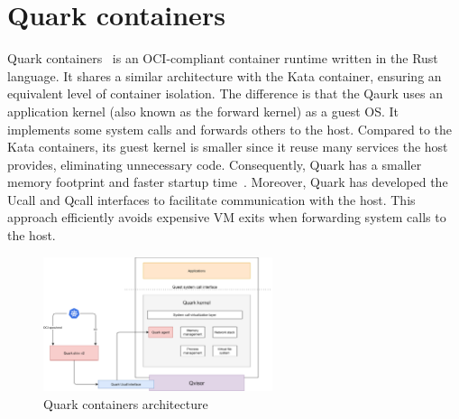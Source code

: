 \section{Quark containers}
\label{sec:Quark}
Quark containers~\cite*{quark} is an OCI-compliant container runtime written in the Rust language. It shares a similar architecture with the Kata container, ensuring an equivalent level of container isolation. 
The difference is that the Qaurk uses an application kernel (also known as the forward kernel) as a guest OS. It implements some system calls and forwards others to the host. Compared to the Kata containers, its guest kernel is smaller since it reuse many services the host provides, eliminating unnecessary code.
Consequently, Quark has a smaller memory footprint and faster startup time~\cite*{quark_performance_report}. Moreover, Quark has developed the Ucall and Qcall interfaces to facilitate communication with the host. This approach efficiently avoids expensive VM exits when 
forwarding system calls to the host.

\begin{figure}[htp]
  \centering
  \includegraphics[width=0.6\textwidth]{images/QUARK_ARCH.PNG}
  \caption[Quark containers architecture]{Quark containers architecture}
  \label{fig:QUARK_ARCH}
\end{figure}


